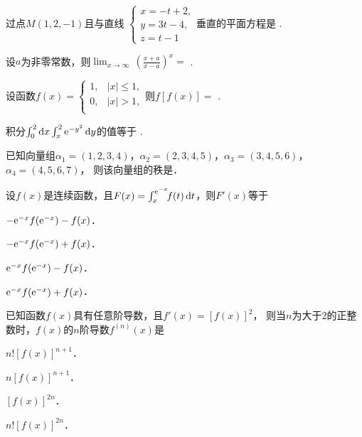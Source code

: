 \documentclass[plain,noanswer,medmath]{../../template/jnuexam}
\begin{document}




\begin{problem}
过点$M(1,2,-1)$且与直线
$\begin{cases}
  x=-t+2, \\
  y=3t-4, \\
  z=t-1
\end{cases}$垂直的平面方程是 \fillin{}.
\end{problem}


\begin{problem}
设$a$为非零常数，则$\lim_{x\to\infty}\,\left(\frac{x+a}{x-a}\right)^x=$ \fillin{}.
\end{problem}


\begin{problem}
设函数$f(x)=\begin{cases}
 1, &  |x|\le 1, \\
 0, &  |x|>1, \\
\end{cases}$则$f[f(x)]=$ \fillin{}.
\end{problem}


\begin{problem}
积分$\int_0^2\mathop{}\!\mathrm{d} x\int_x^2\mathrm{e}^{-y^2}\mathop{}\!\mathrm{d} y$的值等于 \fillin{}.
\end{problem}


\begin{problem}
已知向量组$\alpha_1=(1,2,3,4)$，$\alpha_2=(2,3,4,5)$，$\alpha_3=(3,4,5,6)$，$\alpha_4=(4,5,6,7)$，
则该向量组的秩是\fillin{}．　　
\end{problem}




\begin{problem}
设$f(x)$是连续函数，且$F(x)=\int_x^{\mathrm{e}^{-x}}\!\!f(t)\mathop{}\!\mathrm{d} t$，则$F'(x)$等于\pickout{}
\begin{abcd}
\item $-\mathrm{e}^{-x} f(\mathrm{e}^{-x}) - f(x)$．
\item $-\mathrm{e}^{-x} f(\mathrm{e}^{-x}) + f(x)$．
\item $\mathrm{e}^{-x} f(\mathrm{e}^{-x}) - f(x)$．
\item $\mathrm{e}^{-x} f(\mathrm{e}^{-x}) + f(x)$．
\end{abcd}
\end{problem}


\begin{problem}
已知函数$f(x)$具有任意阶导数，且$f'(x)=[f(x)]^2$，
则当$n$为大于$2$的正整数时，$f(x)$的$n$阶导数$f^{(n)}(x)$是\pickout{}
\begin{abcd}
\item $n![f(x)]^{n+1}$．
\item $n[f(x)]^{n+1}$．
\item $[f(x)]^{2n}$．
\item $n![f(x)]^{2n}$．
\end{abcd}
\end{problem}
\end{document}
